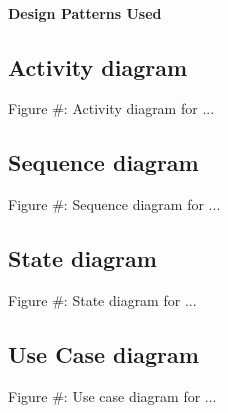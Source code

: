\paragraph{Design Patterns Used}
	
	
		
\subsection{Activity diagram}
	\begin{center}
	    \small{Figure #: Activity diagram for ...}
    \end{center}


\subsection{Sequence diagram}
	\begin{center}
	    \small{Figure #: Sequence diagram for ...}
    \end{center}

\subsection{State diagram}
	\begin{center}
	    \small{Figure #: State diagram for ...}
    \end{center}




\subsection{Use Case diagram}
    \begin{center}
    	\small{Figure #: Use case diagram for ...}
    \end{center}